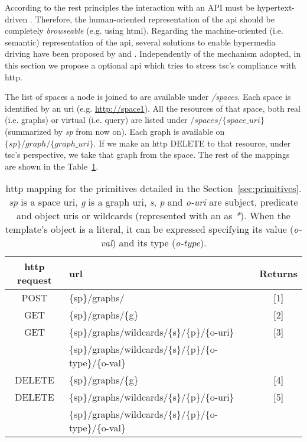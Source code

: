 \begin{sloppypar}
According to the \ac{rest} principles the interaction with an API must be hypertext-driven \citep{fielding_rest_2008}.
Therefore, the human-oriented representation of the \ac{api} should be completely \emph{browseable} (e.g. using \acs{html}).
Regarding the machine-oriented (i.e. semantic) representation of the \ac{api}, several solutions to enable hypermedia driving have been proposed by \citet{verborgh_functional_2012} and \citet{kjernsmo_necessity_2012}. %
Independently of the mechanism adopted, in this section we propose a optional \ac{api} which tries to stress \ac{tsc}'s compliance with \ac{http}.
\end{sloppypar}

The list of spaces a node is joined to are available under \textit{/spaces}.
Each space is identified by an \acs{uri} (e.g. \url{http://space1}).
All the resources of that space, both real (i.e. graphs) or virtual (i.e. query) are listed under $/spaces/\{space\_uri\}$ (summarized by \emph{sp} from now on).
Each graph is available on ${\{sp\}/graph/\{graph\_uri\}}$.
If we make an \acs{http} DELETE to that resource, under \ac{tsc}'s perspective, we take that graph from the space.
The rest of the mappings are shown in the Table~\ref{tab:tscAPI}.

\begin{table} %
  \centering
  \caption {
    \acs{http} mapping for the primitives detailed in the Section~\ref{sec:primitives}. \textit{sp} is a space \acs{uri},
    \textit{g} is a graph \acs{uri}, \textit{s}, \textit{p} and \textit{o-uri} are subject, predicate and object \acsp{uri} or wildcards (represented with an as \textit{*}).
    When the template's object is a literal, it can be expressed specifying its value (\textit{o-val}) and its type (\textit{o-type}).
    \medskip
  }
  \begin{tabular}{c|l|c}
      \acs{http} request & \acs{url} & Returns \\
      \hline
      POST & \{sp\}/graphs/ & [1] \\
      GET & \{sp\}/graphs/\{g\} & [2] \\
      GET & \{sp\}/graphs/wildcards/\{s\}/\{p\}/\{o-uri\} & [3] \\
      & \{sp\}/graphs/wildcards/\{s\}/\{p\}/\{o-type\}/\{o-val\} & \\
      DELETE & \{sp\}/graphs/\{g\} & [4] \\
      DELETE & \{sp\}/graphs/wildcards/\{s\}/\{p\}/\{o-uri\} & [5] \\
      & \{sp\}/graphs/wildcards/\{s\}/\{p\}/\{o-type\}/\{o-val\} & \\
  \end{tabular}
  \label{tab:tscAPI}
\end{table}


